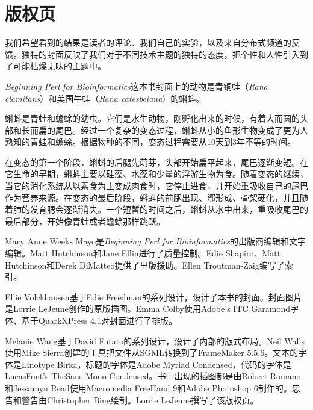 \chapter{版权页}
\label{chap:colophon}
\minitoc

我们希望看到的结果是读者的评论、我们自己的实验，以及来自分布式频道的反馈。独特的封面反映了我们对于不同技术主题的独特的态度，把个性和人性引入到了可能枯燥无味的主题中。

\textit{Beginning Perl for Bioinformatics}这本书封面上的动物是青铜蛙（\textit{Rana clamitans}）和美国牛蛙（\textit{Rana catesbeiana}）的蝌蚪。

蝌蚪是青蛙和蟾蜍的幼虫。它们是水生动物，刚孵化出来的时候，有着大而圆的头部和长而扁的尾巴。经过一个复杂的变态过程，蝌蚪从小的鱼形生物变成了更为人熟知的青蛙和蟾蜍。根据物种的不同，变态过程需要从10天到3年不等的时间。

在变态的第一个阶段，蝌蚪的后腿先萌芽，头部开始扁平起来，尾巴逐渐变短。在它生命的早期，蝌蚪主要以硅藻、水藻和少量的浮游生物为食。随着变态的继续，当它的消化系统从以素食为主变成肉食时，它停止进食，并开始重吸收自己的尾巴作为营养来源。在变态的最后阶段，蝌蚪的前腿出现、鄂形成、骨架硬化，并且随着肺的发育腮会逐渐消失。一个短暂的时间之后，蝌蚪从水中出来，重吸收尾巴的最后部分，开始像青蛙或者蟾蜍那样跳跃。

Mary Anne Weeks Mayo是\textit{Beginning Perl for Bioinformatics}的出版商编辑和文字编辑。Matt Hutchinson和Jane Ellin进行了质量控制。Edie Shapiro、Matt Hutchinson和Derek DiMatteo提供了出版援助。Ellen Troutman-Zaig编写了索引。

Ellie Volckhausen基于Edie Freedman的系列设计，设计了本书的封面。封面图片是Lorrie LeJeune创作的原版插图。Emma Colby使用Adobe's ITC Garamond字体、基于Quark\texttrademark XPress 4.1对封面进行了排版。

Melanie Wang基于David Futato的系列设计，设计了内部的版式布局。Neil Walls使用Mike Sierra创建的工具把文件从SGML转换到了FrameMaker 5.5.6。文本的字体是Linotype Birka，标题的字体是Adobe Myriad Condensed，代码的字体是LucasFont's TheSans Mono Condensed。书中出现的插图都是由Robert Romano和Jessamyn Read使用Macromedia FreeHand 9和Adobe Photoshop 6制作的。忠告和警告由Christopher Bing绘制。Lorrie LeJeune撰写了该版权页。

